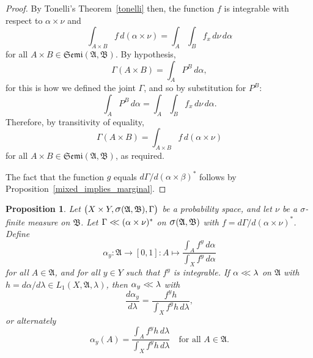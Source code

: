 \documentclass[
twoside=true,
paper=letter,
fontsize=9pt,
pagesize=auto,
leqno,
openany,
headsepline,
overfullrule,
]{scrbook}
\theoremstyle{plain}
\theoremstyle{plain}
\newtheorem{prop}[thm]{Proposition}
\theoremstyle{definition}
\theoremstyle{bfnoteitalic}
\theoremstyle{bfnoteroman}
\newcommand{\sigalg}[1]{\mathfrak{#1}}
\newcommand{\sagb}{\mathop{\hbox{\large{$\sigma$}}}\nolimits}
\newcommand{\textsigma}{\hbox{\large{$\sigma$}}\kern-1pt}
\newcommand{\sigmaalgebra}{\sigalg{A}}
\newcommand{\productsemiring}[2]{\mathfrak{Semi}(#1,#2)}
\newcommand{\productsig}[2]{\sagb(#1,#2)}
\newcommand{\funcf}{f}
\newcommand{\funcg}{g}
\newcommand{\funch}{h}
\newcommand{\function}{f}
\newcommand{\measurespace}{X}
\newcommand{\measurespaceii}{Y}
\newcommand{\abscont}{\mathrel{< \kern-3.5pt <}}
\newcommand{\measnu}{\nu}
\newcommand{\measlambda}{\lambda}
\newcommand{\seti}{A}
\newcommand{\pspace}{\measurespace}%
\newcommand{\sspace}{\measurespaceii}%
\newcommand{\pspaceset}{A}
\newcommand{\sspaceset}{B}
\newcommand{\pspaceelt}{x}
\newcommand{\sspaceelt}{y}
\newcommand{\sspacesig}{\sigalg{B}}
\newcommand{\pspacesig}{\sigalg{A}}
\newcommand{\measonprod}{\Gamma}%
\newcommand{\marginalone}{\alpha}%
\newcommand{\marginaltwo}{\beta}%
\newcommand{\prior}{\marginalone}
\newcommand{\predictive}{\marginaltwo}
\begin{document}
\begin{proof}
By Tonelli's Theorem~\ref{tonelli} then, the function
$\funcf$ is integrable with respect to
$\prior\times\measnu$ and
\[
\int_{\pspaceset\times\sspaceset}
\funcf \,d(\prior\times\measnu)
=
\int_\pspaceset\int_\sspaceset
\function_\pspaceelt\,
d\measnu\,d\prior
\]
for all $\pspaceset\times\sspaceset
\in\productsemiring{\pspacesig}{\sspacesig}.$
By hypothesis,
\[
\measonprod(\pspaceset\times\sspaceset)
=
\int_\pspaceset P^\sspaceset\, d\prior,
\]
for this is how we defined the joint $\measonprod$,
and so by substitution for $P^\sspaceset$:
\[
\int_\pspaceset P^\sspaceset\, d\prior
=
\int_\pspaceset
\int_\sspaceset
\function_\pspaceelt\,
d\measnu\, d\prior.
\]
Therefore, by transitivity of equality,
\[
\measonprod(\pspaceset\times\sspaceset)
=
\int_{\pspaceset\times\sspaceset}
\function \, d(\prior\times\measnu)
\]
for all $\pspaceset\times\sspaceset
\in\productsemiring{\pspacesig}{\sspacesig}$,
as required.

The fact that the function
$\funcg$
equals
$d\measonprod/d(\prior\times\predictive)^*$
follows by Proposition~\ref{mixed_implies_marginal}.
\end{proof}





\begin{prop}
Let
$\bigl(\pspace\times\sspace,
\productsig{\pspacesig}{\sspacesig},
\measonprod\bigr)$
be a probability space, and let
$\measnu$ be a \textsigma-finite measure on $\sspacesig$.
Let  $\measonprod\abscont (\prior\times\measnu)^*$ on
$\productsig{\pspacesig}{\sspacesig}$
with
$\funcf
= d\measonprod/d(\prior\times\measnu)^*$.
Define
\[
\prior_\sspaceelt
:\sigmaalgebra \to [0,1]
:\seti \mapsto
\frac{\int_\pspaceset \function^\sspaceelt \, d\prior}
{\int_\pspace \function^\sspaceelt \, d\prior}
\]
for all $\pspaceset \in \pspacesig$,
and for all $\sspaceelt\in\sspace$ such that
$\function^\sspaceelt$ is integrable.
If $\prior\abscont\measlambda$ on $\pspacesig$ with
$\funch
= d\prior/d\measlambda
\in L_1(\pspace, \pspacesig, \measlambda)$,
then
$\prior_\sspaceelt\abscont\measlambda$ with
\[
\frac
{d \prior_{\sspaceelt}}
{d\measlambda}
=
\frac
{\funcf^{\sspaceelt}\funch}
{\int_{\pspace} \funcf^{\sspaceelt} \funch \, d\measlambda },
\]
or alternately
\[
\prior_{\sspaceelt}(\pspaceset)
=
\frac
{\int_\pspaceset \funcf^{\sspaceelt}\funch \,d\measlambda}
{\int_{\pspace} \funcf^{\sspaceelt} \funch \,d\measlambda}
\quad
\text{for all $\pspaceset\in\pspacesig$.}
\]
\end{prop}
\end{document}
